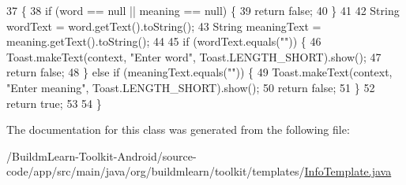 \begin{DoxyCode}
37                                                                                       \{
38         \textcolor{keywordflow}{if} (word == null || meaning == null) \{
39             \textcolor{keywordflow}{return} \textcolor{keyword}{false};
40         \}
41 
42         String wordText = word.getText().toString();
43         String meaningText = meaning.getText().toString();
44 
45         \textcolor{keywordflow}{if} (wordText.equals(\textcolor{stringliteral}{""})) \{
46             Toast.makeText(context, \textcolor{stringliteral}{"Enter word"}, Toast.LENGTH\_SHORT).show();
47             \textcolor{keywordflow}{return} \textcolor{keyword}{false};
48         \} \textcolor{keywordflow}{else} \textcolor{keywordflow}{if} (meaningText.equals(\textcolor{stringliteral}{""})) \{
49             Toast.makeText(context, \textcolor{stringliteral}{"Enter meaning"}, Toast.LENGTH\_SHORT).show();
50             \textcolor{keywordflow}{return} \textcolor{keyword}{false};
51         \}
52         \textcolor{keywordflow}{return} \textcolor{keyword}{true};
53 
54     \}
\end{DoxyCode}


The documentation for this class was generated from the following file\-:\begin{DoxyCompactItemize}
\item 
/\-Buildm\-Learn-\/\-Toolkit-\/\-Android/source-\/code/app/src/main/java/org/buildmlearn/toolkit/templates/\hyperlink{InfoTemplate_8java}{Info\-Template.\-java}\end{DoxyCompactItemize}
